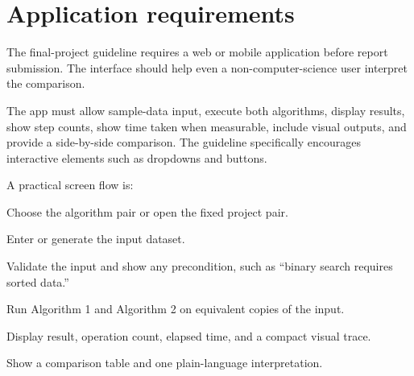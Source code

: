 \section{Application requirements}

The final-project guideline requires a web or mobile application before report submission. The interface should help even a non-computer-science user interpret the comparison.

\begin{projectrequirement}
The app must allow sample-data input, execute both algorithms, display results, show step counts, show time taken when measurable, include visual outputs, and provide a side-by-side comparison. The guideline specifically encourages interactive elements such as dropdowns and buttons.
\end{projectrequirement}

A practical screen flow is:

\begin{mlsteps}
  \item Choose the algorithm pair or open the fixed project pair.
  \item Enter or generate the input dataset.
  \item Validate the input and show any precondition, such as ``binary search requires sorted data.''
  \item Run Algorithm 1 and Algorithm 2 on equivalent copies of the input.
  \item Display result, operation count, elapsed time, and a compact visual trace.
  \item Show a comparison table and one plain-language interpretation.
\end{mlsteps}

\begin{mlfigure}
\end{mlfigure}

